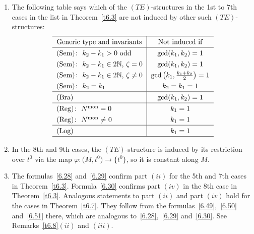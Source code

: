 \documentclass[pdftex]{sigma}%
\numberwithin{equation}{section}
\numberwithin{figure}{section}
\newcommand{\N}{{\mathbb N}}
\begin{document}
\begin{Remarks}
\begin{enumerate}
\item[$(iii)$] The following table says
which of the $(TE)$-structures in the 1st to 7th cases
in the list in Theorem~\ref{t6.3}
are not induced by other such $(TE)$-structures:
\[
\def\arraystretch{1.3}
\begin{tabular}{l|c}
\hline
Generic type and invariants & Not induced if
\\ \hline
(Sem)$\colon\ k_2-k_1>0$ odd & $\gcd(k_1,k_2)=1$
\\
(Sem)$\colon\ k_2-k_1\in 2\N$, $\zeta= 0$ & $\gcd(k_1,k_2)=1$
\\
(Sem)$\colon\ k_2-k_1\in 2\N$, $\zeta\neq 0$ &
$\gcd\big(k_1,\frac{k_1+k_2}{2}\big)=1$
\\
(Sem)$\colon\ k_2=k_1$ &$ k_2=k_1=1 $
\\ \hline
(Bra) & $\gcd(k_1,k_2)=1$
\\ \hline
(Reg)$\colon\ N^{\rm mon}=0$ &$ k_1=1$
\\
(Reg)$\colon\ N^{\rm mon}\neq$ 0 & $k_1=1$
\\ \hline
(Log) & $k_1=1$
\\
\hline
\end{tabular}
\]

\item[$(iv)$] In the 8th and 9th cases, the $(TE)$-structure is
induced by its restriction over $t^0$ via the map
$\varphi\colon \big(M,t^0\big)\to\big\{t^0\big\}$, so it is constant
along $M$.

\item[$(v)$] The formulas~\eqref{6.28} and~\eqref{6.29}
confirm part $(ii)$ for the 5th and 7th cases in Theorem~\ref{t6.3}.
Formula~\eqref{6.30} confirms part $(iv)$ in the
8th case in Theorem~\ref{t6.3}.
Analogous statements to part $(ii)$ and part $(iv)$
hold for the cases in Theorem~\ref{t6.7}.
They follow from the formulas~\eqref{6.49},~\eqref{6.50}
and~\eqref{6.51} there,
which are analogous to~\eqref{6.28},~\eqref{6.29}
and~\eqref{6.30}.
See Remarks~\ref{t6.8}$(ii)$ and $(iii)$.
\end{enumerate}
\end{Remarks}
\end{document}
